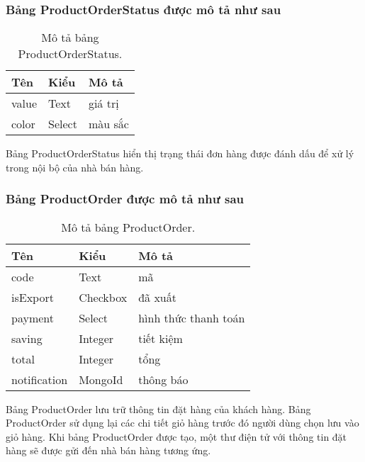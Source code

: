 \subsubsection{Bảng ProductOrderStatus được mô tả như sau}
\begin{table}[!htbp]\fontsize{13px}{13px}\selectfont\justifying
\begin{center}
\caption{Mô tả bảng ProductOrderStatus.}
\begin{tabularx}{0.6\textwidth}{ |l|l|X| } 
\hline
Tên & Kiểu & Mô tả \\
\hline
value & Text & giá trị \\
color & Select & màu sắc \\ 
\hline
\end{tabularx}
\label{table:ProductOrderStatus}
\end{center}
Bảng ProductOrderStatus hiển thị trạng thái đơn hàng được đánh dấu để xử lý trong nội bộ của nhà bán hàng.
\end{table}

\subsubsection{Bảng ProductOrder được mô tả như sau}
\begin{table}[!htbp]\fontsize{13px}{13px}\selectfont\justifying
\begin{center}
\caption{Mô tả bảng ProductOrder.}
\begin{tabularx}{0.6\textwidth}{ |l|l|X| } 
\hline
Tên & Kiểu & Mô tả \\
\hline
code & Text & mã \\
isExport & Checkbox & đã xuất \\
payment & Select & hình thức thanh toán \\
saving & Integer & tiết kiệm \\
total & Integer & tổng \\
notification & MongoId & thông báo \\ 
\hline
\end{tabularx}
\label{table:ProductOrder}
\end{center}
Bảng ProductOrder lưu trữ thông tin đặt hàng của khách hàng. Bảng ProductOrder sử dụng lại các chi tiết giỏ hàng trước đó người dùng chọn lưu vào giỏ hàng. Khi bảng ProductOrder được tạo, một thư điện tử với thông tin đặt hàng sẽ được gửi đến nhà bán hàng tương ứng.
\end{table}
\clearpage
